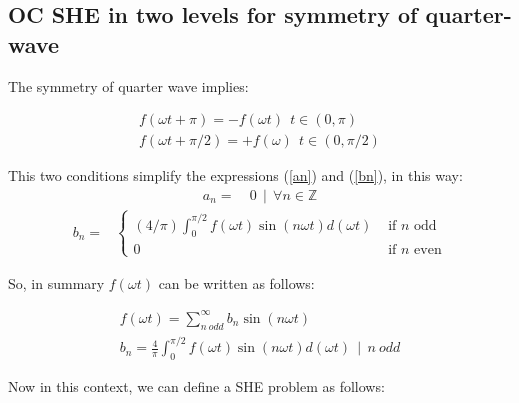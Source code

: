 \subsection{OC SHE in two levels for symmetry of quarter-wave} 


The symmetry of quarter wave implies:

\begin{gather}
    f(\omega t + \pi)     = -f(\omega t)  \ \ t \in (0,\pi)\\
    f(\omega t + \pi/2)   = +f(\omega)    \ \ t \in (0,\pi/2)
\end{gather}

This two conditions simplify the expressions (\ref{an}) and (\ref{bn}), in this way:
\begin{align}
    a_n = & \  0 \ \ | \  \ \forall n \in \mathbb{Z}
\end{align}
\begin{align}
    b_n = & \begin{cases}
        (4/\pi) \int_0^{\pi/2} f(\omega t ) \sin(n\omega t)d(\omega t) & \text{ if } n \text{ odd} \\
        0 & \text{ if } n \text{ even}
    \end{cases}
\end{align}

So, in summary $f(\omega t )$ can be written as follows:

\begin{gather}
    f(\omega t ) = \sum_{n \ odd}^\infty  b_n \sin(n \omega t) \\
    b_n = \frac{4}{\pi}\int_0^{\pi/2} f(\omega t ) \sin(n\omega t)d(\omega t) \ \ | \ \ n \ odd \label{bn_odd}
\end{gather}


Now in this context, we can define a SHE problem as follows:



